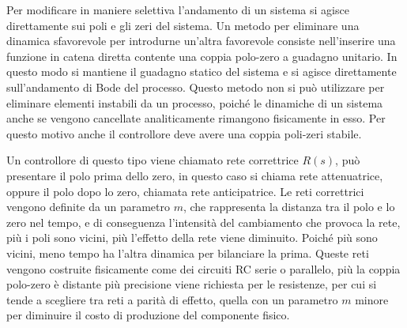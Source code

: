 \documentclass{article}
\numberwithin{equation}{subsection}
\begin{document}
Per modificare in maniere selettiva l'andamento di un sistema si agisce direttamente sui poli e gli zeri del sistema. Un metodo per eliminare una dinamica sfavorevole per 
introdurne un'altra favorevole consiste nell'inserire una funzione in catena diretta contente una coppia polo-zero a guadagno unitario. In questo modo si mantiene il guadagno statico 
del sistema e si agisce direttamente sull'andamento di Bode del processo. Questo metodo non si può utilizzare per eliminare elementi instabili da un processo, poiché le 
dinamiche di un sistema anche se vengono cancellate analiticamente rimangono fisicamente in esso. Per questo motivo anche il controllore deve avere una coppia poli-zeri 
stabile. 


Un controllore di questo tipo viene chiamato rete correttrice $R(s)$, può presentare il polo prima dello zero, in questo caso si chiama rete attenuatrice, oppure il polo 
dopo lo zero, chiamata rete anticipatrice. Le reti correttrici vengono definite da un parametro $m$, che rappresenta la distanza tra il polo e lo zero nel tempo, e di conseguenza 
l'intensità del cambiamento che provoca la rete, più i poli sono vicini, più l'effetto della rete viene diminuito. Poiché più sono vicini, meno tempo ha l'altra dinamica 
per bilanciare la prima. Queste reti vengono costruite fisicamente come dei circuiti RC serie o parallelo, più la coppia polo-zero è distante più precisione viene richiesta per le 
resistenze, per cui si tende a scegliere tra reti a parità di effetto, quella con un parametro $m$ minore per diminuire il costo di produzione del componente fisico.  

\begin{figure}[H]%
    \centering
    \qquad
\end{figure}
\end{document}
